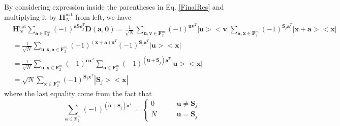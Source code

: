 \documentclass{article}
\begin{document}
\begin{enumerate}
	By considering expression inside the parentheses in  Eq. \eqref{FinalRes} and multiplying it by $\mathbf{H}_N^{\text{nat}}$ from left, we have
	\begin{align}
		&\mathbf{H}_N^{\text{nat}} \sum_{\mathbf{a} \in \mathbb{F}^m_2}{(-1)^{\mathbf{a S }\mathbf{e}_j^T} \mathbf{D(a,0)}}= \frac{1}{\sqrt{N}} \sum_{\mathbf{u}, \mathbf{v} \in \mathbf{F}_2^m}{\left(-1\right)^{\mathbf{u} \mathbf{v}^T } |\mathbf{u}><\mathbf{v}|} \sum_{\mathbf{a}, \mathbf{x} \in \mathbf{F}_2^m}{\left(-1\right)^{\mathbf{S}_j \mathbf{a}^T } |\mathbf{x+a}><\mathbf{x}|} \nonumber \\
		&=\frac{1}{\sqrt{N}} \sum_{\mathbf{u}, \mathbf{x}, \mathbf{a} \in \mathbf{F}_2^m}{(-1)^{(\mathbf{x+a})\mathbf{u}^T} (-1)^{\mathbf{S}_j \mathbf{a}^T}|\mathbf{u}><\mathbf{x}| } \nonumber \\ 
		&=\frac{1}{\sqrt{N}} \sum_{\mathbf{u}, \mathbf{x} \in \mathbf{F}_2^m}{(-1)^{\mathbf{u} \mathbf{x}^T} \sum_{ \mathbf{a} \in \mathbf{F}_2^m}{(-1)^{(\mathbf{u+S}_j)\mathbf{a}^T}} |\mathbf{u}><\mathbf{x}| }  \nonumber \\
		&=\sqrt{N} \sum_{ \mathbf{x} \in \mathbf{F}_2^m}{(-1)^{\mathbf{S}_j \mathbf{x}^T} |\mathbf{S}_j><\mathbf{x}| }\label{HsubRes}
	\end{align}
	where the last equality come from the fact that 
	\begin{equation}
		\sum_{ \mathbf{a} \in \mathbf{F}_2^m}{(-1)^{(\mathbf{u+S}_j)\mathbf{a}^T}} = 
		\begin{cases}
			0 & \qquad \mathbf{u} \neq \mathbf{S}_j \\
			N & \qquad \mathbf{u} = \mathbf{S}_j
		\end{cases}
	\end{equation}
	

\end{enumerate}
\end{document}
